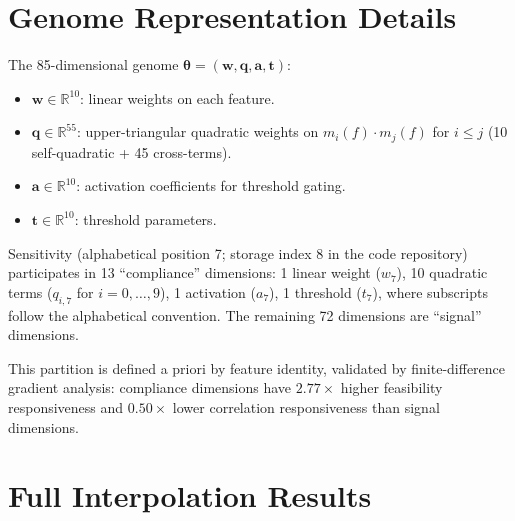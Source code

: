 \documentclass[twoside,11pt]{article}
\newcommand{\R}{\mathbb{R}}
\newcommand{\btheta}{\boldsymbol{\theta}}
\begin{document}
\section{Genome Representation Details}
\label{app:genome}

The 85-dimensional genome $\btheta = (\mathbf{w}, \mathbf{q}, \mathbf{a}, \mathbf{t})$:

\begin{itemize}
\item $\mathbf{w} \in \R^{10}$: linear weights on each feature.
\item $\mathbf{q} \in \R^{55}$: upper-triangular quadratic weights on
  $m_i(f) \cdot m_j(f)$ for $i \leq j$ (10 self-quadratic + 45 cross-terms).
\item $\mathbf{a} \in \R^{10}$: activation coefficients for threshold gating.
\item $\mathbf{t} \in \R^{10}$: threshold parameters.
\end{itemize}

Sensitivity (alphabetical position 7; storage index 8 in the code repository)
participates in 13 ``compliance'' dimensions: 1 linear weight ($w_7$),
10 quadratic terms ($q_{i,7}$ for $i = 0, \ldots, 9$), 1 activation ($a_7$),
1 threshold ($t_7$), where subscripts follow the alphabetical convention.
The remaining
72 dimensions are ``signal'' dimensions.

This partition is defined a priori by feature identity, validated by
finite-difference gradient analysis: compliance dimensions have $2.77\times$
higher feasibility responsiveness and $0.50\times$ lower correlation
responsiveness than signal dimensions.

\section{Full Interpolation Results}
\label{app:interpolation}
\end{document}
